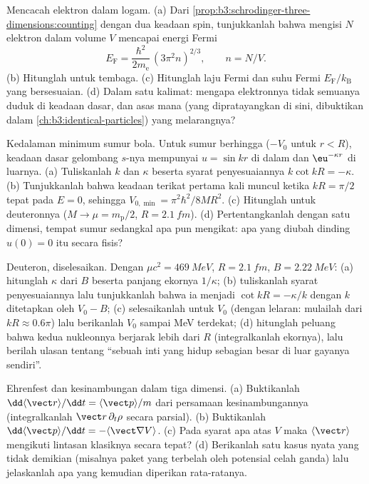 \begin{exercise}[$\star\star$]\label{exo:b3:schrodinger-three-dimensions:8}
Mencacah elektron dalam logam. (a) Dari
\cref{prop:b3:schrodinger-three-dimensions:counting} dengan dua keadaan
spin, tunjukkanlah bahwa mengisi $N$ elektron dalam volume $V$ mencapai
energi Fermi
\[
E_{\text{F}} = \frac{\hbar^2}{2m_{\text{e}}}\,(3\pi^2n)^{2/3} ,
\qquad n = N/V .
\]
(b) Hitunglah untuk tembaga. (c) Hitunglah laju Fermi dan suhu Fermi
$E_{\text{F}}/k_{\text{B}}$ yang bersesuaian. (d) Dalam satu kalimat:
mengapa elektronnya tidak semuanya duduk di keadaan dasar, dan asas
mana (yang dipratayangkan di sini, dibuktikan dalam
\cref{ch:b3:identical-particles}) yang melarangnya?
\end{exercise}

\begin{exercise}[$\star\star$]\label{exo:b3:schrodinger-three-dimensions:9}
Kedalaman minimum sumur bola. Untuk sumur berhingga ($-V_0$ untuk
$r < R$), keadaan dasar gelombang $s$-nya mempunyai $u = \sin kr$ di
dalam dan $\eu^{-\kappa r}$ di luarnya. (a) Tuliskanlah $k$ dan $\kappa$
beserta syarat penyesuaiannya $k\cot kR = -\kappa$. (b) Tunjukkanlah
bahwa keadaan terikat pertama kali muncul ketika $kR = \pi/2$ tepat pada
$E = 0$, sehingga $V_{0,\min} = \pi^2\hbar^2/8MR^2$. (c) Hitunglah untuk
deuteronnya ($M \to \mu = m_{\text{p}}/2$, $R = \qty{2.1}{fm}$). (d)
Pertentangkanlah dengan satu dimensi, tempat sumur sedangkal apa pun
mengikat: apa yang diubah dinding $u(0) = 0$ itu secara fisis?
\end{exercise}

\begin{exercise}[$\star\star\star$]\label{exo:b3:schrodinger-three-dimensions:10}
Deuteron, diselesaikan. Dengan $\mu c^2 = \qty{469}{MeV}$, $R =
\qty{2.1}{fm}$, $B = \qty{2.22}{MeV}$: (a) hitunglah $\kappa$ dari $B$
beserta panjang ekornya $1/\kappa$; (b) tuliskanlah syarat
penyesuaiannya lalu tunjukkanlah bahwa ia menjadi $\cot kR = -\kappa/k$
dengan $k$ ditetapkan oleh $V_0 - B$; (c) selesaikanlah untuk $V_0$
(dengan lelaran: mulailah dari $kR \approx 0.6\pi$) lalu berikanlah
$V_0$ sampai MeV terdekat; (d) hitunglah peluang bahwa kedua nukleonnya
berjarak lebih dari $R$ (integralkanlah ekornya), lalu berilah ulasan
tentang ``sebuah inti yang hidup sebagian besar di luar gayanya sendiri''.
\end{exercise}

\begin{exercise}[$\star\star\star$]\label{exo:b3:schrodinger-three-dimensions:11}
Ehrenfest dan kesinambungan dalam tiga dimensi. (a) Buktikanlah
$\dd\langle\vect r\rangle/\dd t = \langle\vect p\rangle/m$ dari
persamaan kesinambungannya (integralkanlah $\vect r\,\partial_t\rho$
secara parsial). (b) Buktikanlah $\dd\langle\vect p\rangle/\dd t =
-\langle\vect\nabla V\rangle$. (c) Pada syarat apa atas $V$ maka
$\langle\vect r\rangle$ mengikuti lintasan klasiknya secara tepat? (d)
Berikanlah satu kasus nyata yang tidak demikian (misalnya paket yang
terbelah oleh potensial celah ganda) lalu jelaskanlah apa yang kemudian
diperikan rata-ratanya.
\end{exercise}

